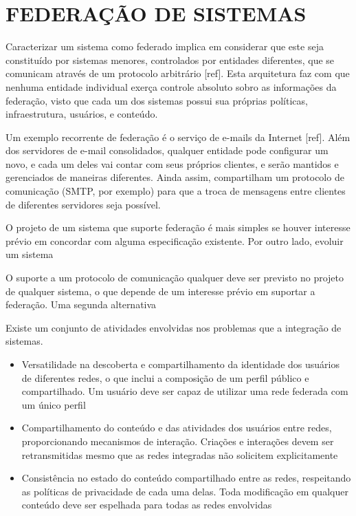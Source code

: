 \section{FEDERAÇÃO DE SISTEMAS}


Caracterizar um sistema como federado implica em considerar que este seja
constituído por sistemas menores, controlados por entidades diferentes, que se
comunicam através de um protocolo arbitrário [ref]. Esta arquitetura faz com que 
nenhuma entidade individual exerça controle absoluto sobro as informações da 
federação, visto que cada um dos sistemas possui sua próprias políticas, 
infraestrutura, usuários, e conteúdo.


Um exemplo recorrente de federação é o serviço de e-mails da Internet [ref]. Além
dos servidores de e-mail consolidados, qualquer entidade pode configurar um novo, e 
cada um deles vai contar com seus próprios clientes, e serão mantidos e gerenciados
de maneiras diferentes. Ainda assim, compartilham um protocolo de comunicação (SMTP,
por exemplo) para que a troca de mensagens entre clientes de diferentes servidores
seja possível.

O projeto de um sistema que suporte federação é mais simples se houver interesse
prévio em concordar com alguma especificação existente. Por outro lado, evoluir um
sistema 


O suporte a um protocolo de comunicação qualquer deve ser previsto no projeto de
qualquer sistema, o que depende de um interesse prévio em suportar a federação. Uma
segunda alternativa 



Existe um conjunto de atividades envolvidas nos problemas que  a integração
de sistemas.

\begin{itemize}
  \item{Versatilidade na descoberta e compartilhamento da identidade dos usuários
        de diferentes redes, o que inclui a composição de um perfil público e
        compartilhado. Um usuário deve ser capaz de utilizar uma rede federada com
        um único perfil}
  \item{Compartilhamento do conteúdo e das atividades dos usuários entre redes,
        proporcionando mecanismos de interação. Criações e interações devem ser
        retransmitidas mesmo que as redes integradas não solicitem explicitamente}
  \item{Consistência no estado do conteúdo compartilhado entre as redes, respeitando
        as políticas de privacidade de cada uma delas. Toda modificação em qualquer
        conteúdo deve ser espelhada para todas as redes envolvidas}
\end{itemize}

